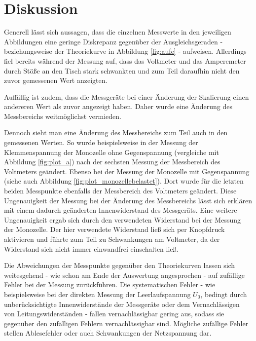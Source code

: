 \section{Diskussion}
\label{sec:Diskussion}
Generell lässt sich aussagen, dass die einzelnen Messwerte in den jeweiligen Abbildungen eine geringe Diskrepanz gegenüber der Ausgleichsgeraden - beziehungsweise der Theoriekurve in Abbildung \ref{fig:aufe} - aufweisen. Allerdings fiel bereits während der Messung auf, dass das Voltmeter und das Amperemeter durch Stöße an den Tisch stark schwankten und zum Teil daraufhin nicht den zuvor gemessenen Wert anzeigten.

Auffällig ist zudem, dass die Messgeräte bei einer Änderung der Skalierung einen andereren Wert als zuvor angezeigt haben. Daher wurde eine Änderung des Messbereichs weitmöglichst vermieden.

Dennoch sieht man eine Änderung des Messbereichs zum Teil auch in den gemessenen Werten. So wurde beispielsweise in der Messung der Klemmenspannung der Monozelle ohne Gegenspannung (vergleiche mit Abbildung \ref{fig:plot_a}) nach der sechsten Messung der Messbereich des Voltmeters geändert.
Ebenso bei der Messung der Monozelle mit Gegenspannung (siehe auch Abbildung \ref{fig:plot_monozellebelastet}). Dort wurde für die letzten beiden Messpunkte ebenfalls der Messbereich des Voltmeters geändert.
Diese Ungenauigkeit der Messung bei der Änderung des Messbereichs lässt sich erklären mit einem dadurch geänderten Innenwiderstand des Messgeräts.
Eine weitere Ungenauigkeit ergab sich durch den verwendeten Widerstand bei der Messung der Monozelle. Der hier verwendete Widerstand ließ sich per Knopfdruck aktivieren und führte zum Teil zu Schwankungen am Voltmeter, da der Widerstand sich nicht immer einwandfrei einschalten ließ.

Die Abweichungen der Messpunkte gegenüber den Theoriekurven lassen sich weitesgehend - wie schon am Ende der Auswertung angesprochen - auf zufällige Fehler bei der Messung zurückführen.
Die systematischen Fehler - wie beispielsweise bei der direkten Messung der Leerlaufspannung $U_0$, bedingt durch unberücksichtigte Innenwiderstände der Messgeräte oder dem Vernachlässigen von Leitungswiderständen - fallen vernachlässigbar gering aus, sodass sie gegenüber den zufälligen Fehlern vernachlässigbar sind.
Mögliche zufällige Fehler stellen Ablesefehler oder auch Schwankungen der Netzspannung dar.
